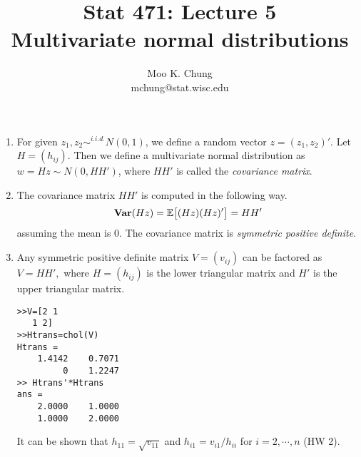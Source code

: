 \documentclass[11pt,twocolumn]{article} %
\begin{document}
\title{Stat 471: Lecture 5\\
Multivariate normal distributions}
\author{Moo K. Chung\\
mchung@stat.wisc.edu}
\maketitle \thispagestyle{empty}

\begin{enumerate}
\item For given $z_1,z_2 \sim^{i.i.d.} N(0,1)$, we define a random
vector $z=(z_1,z_2)'$. Let $H=(h_{ij})$. Then we define a
multivariate normal distribution as $w=Hz \sim N(0, HH')$, where
$HH'$ is called the {\em covariance matrix}.

\item The covariance matrix $HH'$ is computed in the following
way. $${\bf Var} (Hz) = \mathbb{E} \big[(Hz)(Hz)'\big] =HH'$$
 assuming the mean is 0. The covariance matrix is {\em symmetric
 positive definite}.

\item Any symmetric positive definite matrix $V=(v_{ij})$ can be
factored as $V= HH',$ where $H=(h_{ij})$ is the lower triangular
matrix and $H'$ is the upper triangular matrix.

\begin{verbatim}
>>V=[2 1
   1 2]
>>Htrans=chol(V)
Htrans =
    1.4142    0.7071
         0    1.2247
>> Htrans'*Htrans
ans =
    2.0000    1.0000
    1.0000    2.0000
\end{verbatim}

It can be shown that $h_{11}=\sqrt{v_{11}}$ and
$h_{i1}=v_{i1}/h_{ii}$ for $i=2,\cdots, n$ (HW 2).


\end{enumerate}
\end{document}
